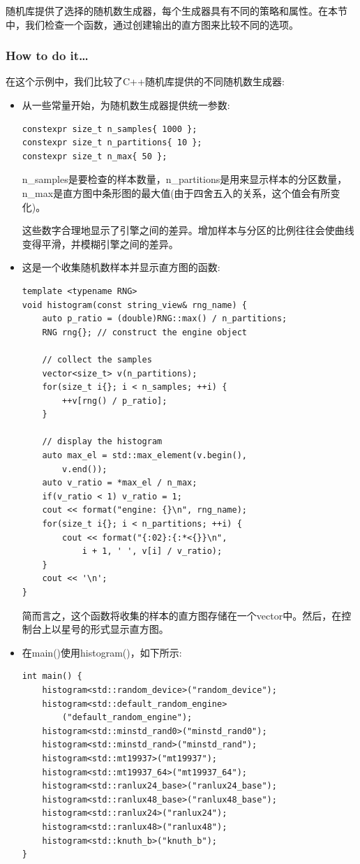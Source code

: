 
随机库提供了选择的随机数生成器，每个生成器具有不同的策略和属性。在本节中，我们检查一个函数，通过创建输出的直方图来比较不同的选项。

\subsubsection{How to do it…}

在这个示例中，我们比较了C++随机库提供的不同随机数生成器:

\begin{itemize}
\item 
从一些常量开始，为随机数生成器提供统一参数:

\begin{lstlisting}[style=styleCXX]
constexpr size_t n_samples{ 1000 };
constexpr size_t n_partitions{ 10 };
constexpr size_t n_max{ 50 };
\end{lstlisting}

n\_samples是要检查的样本数量，n\_partitions是用来显示样本的分区数量，n\_max是直方图中条形图的最大值(由于四舍五入的关系，这个值会有所变化)。

这些数字合理地显示了引擎之间的差异。增加样本与分区的比例往往会使曲线变得平滑，并模糊引擎之间的差异。

\item 
这是一个收集随机数样本并显示直方图的函数:

\begin{lstlisting}[style=styleCXX]
template <typename RNG>
void histogram(const string_view& rng_name) {
	auto p_ratio = (double)RNG::max() / n_partitions;
	RNG rng{}; // construct the engine object
	
	// collect the samples
	vector<size_t> v(n_partitions);
	for(size_t i{}; i < n_samples; ++i) {
		++v[rng() / p_ratio];
	}

	// display the histogram
	auto max_el = std::max_element(v.begin(),
		v.end());
	auto v_ratio = *max_el / n_max;
	if(v_ratio < 1) v_ratio = 1;
	cout << format("engine: {}\n", rng_name);
	for(size_t i{}; i < n_partitions; ++i) {
		cout << format("{:02}:{:*<{}}\n",
			i + 1, ' ', v[i] / v_ratio);
	}
	cout << '\n';
}
\end{lstlisting}


简而言之，这个函数将收集的样本的直方图存储在一个vector中。然后，在控制台上以星号的形式显示直方图。

\item 
在main()使用histogram()，如下所示:

\begin{lstlisting}[style=styleCXX]
int main() {
	histogram<std::random_device>("random_device");
	histogram<std::default_random_engine>
		("default_random_engine");
	histogram<std::minstd_rand0>("minstd_rand0");
	histogram<std::minstd_rand>("minstd_rand");
	histogram<std::mt19937>("mt19937");
	histogram<std::mt19937_64>("mt19937_64");
	histogram<std::ranlux24_base>("ranlux24_base");
	histogram<std::ranlux48_base>("ranlux48_base");
	histogram<std::ranlux24>("ranlux24");
	histogram<std::ranlux48>("ranlux48");
	histogram<std::knuth_b>("knuth_b");
}
\end{lstlisting}


\end{itemize}
